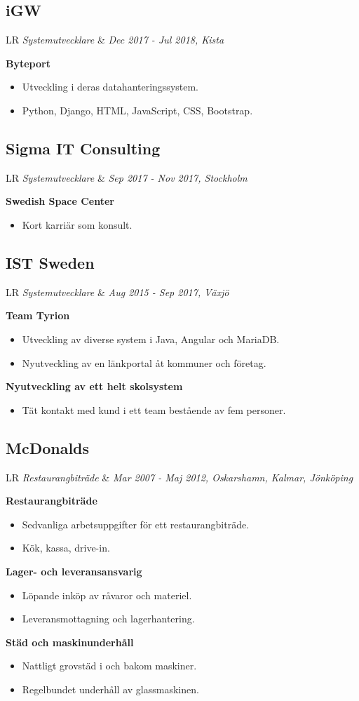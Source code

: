 \documentclass[11pt,a4paper]{moderncv}
\newcommand*{\experienceentry}[5][1.5mm]{
    \subsection{#2} \vspace{-1.5mm}
    \begin{tabularx}{\textwidth}{LR}
        {\itshape #3} & {\itshape #4, #5}
    \end{tabularx}
    \par\addvspace{#1}
}
\begin{document}
\begin{minipage}[t]{0.62\textwidth}
\experienceentry{iGW}{Systemutvecklare}{Dec 2017 - Jul 2018}{Kista}
\textbf{Byteport}
\begin{itemize}
  \item Utveckling i deras datahanteringssystem.
  \item Python, Django, HTML, JavaScript, CSS, Bootstrap.
\end{itemize}
\vspace{2.0mm}

\experienceentry{Sigma IT Consulting}{Systemutvecklare}{Sep 2017 - Nov 2017}{Stockholm}
\textbf{Swedish Space Center}
\begin{itemize}
  \item Kort karriär som konsult.
\end{itemize}
\vspace{2.0mm}

\experienceentry{IST Sweden}{Systemutvecklare}{Aug 2015 - Sep 2017}{Växjö}

\textbf{Team Tyrion}
\begin{itemize}
    \item Utveckling av diverse system i Java, Angular och MariaDB.
    \item Nyutveckling av en länkportal åt kommuner och företag.
\end{itemize}
\vspace{1.0mm}

\textbf{Nyutveckling av ett helt skolsystem}
\begin{itemize}
    \item Tät kontakt med kund i ett team bestående av fem personer.
\end{itemize}
\vspace{2.0mm}

\experienceentry{McDonalds}{Restaurangbiträde}{Mar 2007 - Maj 2012}{Oskarshamn, Kalmar, Jönköping}
\vspace{-4.0mm}
\textbf{Restaurangbiträde}
\begin{itemize}
  \item Sedvanliga arbetsuppgifter för ett restaurangbiträde.
  \item Kök, kassa, drive-in.
\end{itemize}

\textbf{Lager- och leveransansvarig}
\begin{itemize}
  \item Löpande inköp av råvaror och materiel.
  \item Leveransmottagning och lagerhantering.
\end{itemize}

\textbf{Städ och maskinunderhåll}
\begin{itemize}
  \item Nattligt grovstäd i och bakom maskiner.
  \item Regelbundet underhåll av glassmaskinen.
\end{itemize}

\end{minipage}
\end{document}
